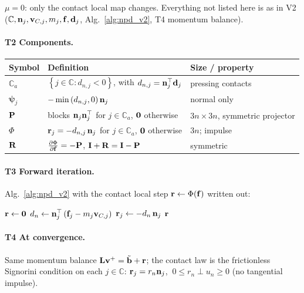 \noindent $\mu = 0$: only the contact local map changes. Everything not listed here is as in V2 ($\mathbb{C}, \mathbf{n}_j, \mathbf{v}_{C,j}, m_j, \mathbf{f}, \mathbf{d}_j$, Alg.~\ref{alg:npd_v2}, T4 momentum balance).

\paragraph{T2 Components.}\mbox{}
\begin{center}
\renewcommand{\arraystretch}{1.4}
\begin{tabular}{lll}
\textbf{Symbol} & \textbf{Definition} & \textbf{Size / property} \\ \hline
$\mathbb{C}_a$ & $\left\{j \in \mathbb{C} : d_{n,j} < 0\right\}$, with $d_{n,j} = \mathbf{n}_j^\top\mathbf{d}_j$ & pressing contacts \\
$\boldsymbol{\psi}_j$ & $-\min\left(d_{n,j}, 0\right)\mathbf{n}_j$ & normal only \\
$\mathbf{P}$         & blocks $\mathbf{n}_j\mathbf{n}_j^\top$ for $j \in \mathbb{C}_a$, $\mathbf{0}$ otherwise & $3n\times 3n$, symmetric projector \\
$\Phi$        & $\mathbf{r}_j = -d_{n,j}\,\mathbf{n}_j$ for $j \in \mathbb{C}_a$, $\mathbf{0}$ otherwise & $3n$; impulse \\
$\mathbf{R}$          & $\frac{\partial \Phi}{\partial \mathbf{f}} = -\mathbf{P}$, \quad $\mathbf{I} + \mathbf{R} = \mathbf{I} - \mathbf{P}$ & symmetric \\
\end{tabular}
\end{center}
\paragraph{T3 Forward iteration.}\mbox{}
\newline Alg.~\ref{alg:npd_v2} with the contact local step $\mathbf{r} \gets \Phi(\mathbf{f})$ written out:
\begin{algorithm}[H]
\caption{V2a: contact local step.}
\label{alg:npd_v2a_contact}
\begin{algorithmic}[1]
    \State $\mathbf{r} \gets \mathbf{0}$
        \State $d_n \gets \mathbf{n}_j^\top\left(\mathbf{f}_j - m_j\mathbf{v}_{C,j}\right)$
         
            \State $\mathbf{r}_j \gets -d_n\,\mathbf{n}_j$
        \EndIf
    \EndFor
    \State \Return $\mathbf{r}$
\EndFunction
\end{algorithmic}
\end{algorithm}
\paragraph{T4 At convergence.}\mbox{}
\newline Same momentum balance $\mathbf{L}\mathbf{v}^+ = \tilde{\mathbf{b}} + \mathbf{r}$; the contact law is the frictionless Signorini condition on each $j \in \mathbb{C}$: $\mathbf{r}_j = r_n\mathbf{n}_j$, $\ 0 \le r_n \perp u_n \ge 0$ (no tangential impulse).

